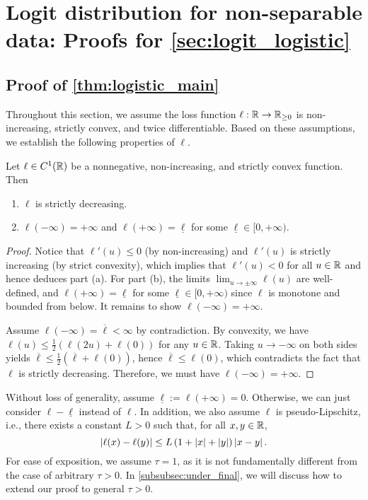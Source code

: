 \section{Logit distribution for non-separable data: Proofs for \cref{sec:logit_logistic}}
\label{append_sec:nonsep}

\subsection{Proof of \cref{thm:logistic_main}}

Throughout this section, we assume the loss function $\ell: \mathbb{R} \to \mathbb{R}_{\ge 0}$ is non-increasing, strictly convex, and twice differentiable. Based on these assumptions, we establish the following properties of $\ell$.
\begin{lem}\label{lem:ell}
    Let $\ell \in C^1(\mathbb{R})$ be a nonnegative, non-increasing, and strictly convex function. Then
    \begin{enumerate}[label=(\alph*)]
        \item $\ell$ is strictly decreasing.
        \item $\ell(-\infty) = +\infty$ and $\ell(+\infty) = \underline{\ell}$ for some $\underline{\ell} \in [0, +\infty)$. 
    \end{enumerate}
\end{lem}
\begin{proof}
    Notice that $\ell'(u) \le 0$ (by non-increasing) and $\ell'(u)$ is strictly increasing (by strict convexity), which implies that $\ell'(u) < 0$ for all $u \in \mathbb{R}$ and hence deduces part (a). For part (b), the limits $\lim_{u \to \pm \infty} \ell(u)$ are well-defined, and $\ell(+\infty) = \underline{\ell}$ for some $\underline{\ell} \in [0, +\infty)$ since $\ell$ is monotone and bounded from below. It remains to show $\ell(-\infty) = +\infty$.

    Assume $\ell(-\infty) = \overline{\ell} < \infty$ by contradiction. By convexity, we have $\ell(u) \le \frac12( \ell(2u) + \ell(0) )$ for any $u \in \mathbb{R}$. Taking $u \to -\infty$ on both sides yields $\overline{\ell} \le \frac{1}{2}(\overline{\ell} + \ell(0))$, hence $\overline{\ell} \le \ell(0)$, which contradicts the fact that $\ell$ is strictly decreasing. Therefore, we must have $\ell(-\infty) = +\infty$.
\end{proof}
Without loss of generality, assume $\underline{\ell} := \ell(+\infty) = 0$. Otherwise, we can just consider $\ell - \underline{\ell}$ instead of $\ell$. In addition, we also assume $\ell$ is pseudo-Lipschitz, i.e., there exists a constant $L > 0$ such that, for all $x, y \in \mathbb{R}$,
\begin{equation*}
    \left|{ \ell(x) - \ell(y) }\right| \le L \left( 1 + \left|{ x }\right| + \left|{ y }\right| \right) \left|{ x - y }\right|.
\end{equation*}
For ease of exposition, we assume $\tau = 1$, as it is not fundamentally different from the case of arbitrary $\tau > 0$. In \cref{subsubsec:under_final}, we will discuss how to extend our proof to general $\tau > 0$.

